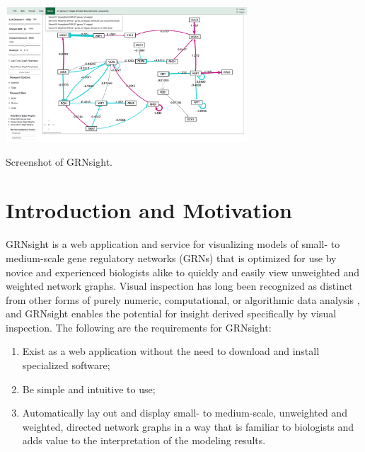 \documentclass[sigconf,review,anonymous]{acmart}
\begin{document}



\begin{teaserfigure}
  \centering
  \includegraphics[height=2in]{screenshot-always-show-weights.png}
  \caption{Screenshot of GRNsight.}
  \label{fig:teaser}
\end{teaserfigure}


\maketitle

\section{Introduction and Motivation}

GRNsight is a web application and service for visualizing models of small- to medium-scale gene regulatory networks (GRNs) that is optimized for use by novice and experienced biologists alike to quickly and easily view unweighted and weighted network graphs. Visual inspection has long been recognized as distinct from other forms of purely numeric, computational, or algorithmic data analysis \cite{mulrow2002visual, card1999readings}, and GRNsight enables the potential for insight derived specifically by visual inspection. The following are the requirements for GRNsight:

\begin{enumerate}
\item Exist as a web application without the need to download and install specialized software;
\item Be simple and intuitive to use;
\item Automatically lay out and display small- to medium-scale, unweighted and weighted, directed network graphs in a way that is familiar to biologists and adds value to the interpretation of the modeling results.
\end{enumerate}
\end{document}
